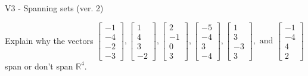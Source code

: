 \begin{exercise}
  \begin{exerciseTitle}V3 - Spanning sets (ver. 2)\end{exerciseTitle}
  \begin{exerciseStatement}
    Explain why the vectors \(\left[\begin{array}{r}
-1 \\
-4 \\
-2 \\
-3
\end{array}\right] , \left[\begin{array}{r}
1 \\
4 \\
3 \\
-2
\end{array}\right] , \left[\begin{array}{r}
2 \\
-1 \\
0 \\
3
\end{array}\right] , \left[\begin{array}{r}
-5 \\
-4 \\
3 \\
-4
\end{array}\right] , \left[\begin{array}{r}
1 \\
3 \\
-3 \\
3
\end{array}\right] , \text{ and } \left[\begin{array}{r}
-1 \\
-4 \\
4 \\
2
\end{array}\right]\) span or don't span \(\mathbb{R}^4\). 
	



\end{exerciseStatement}
\end{exercise}
